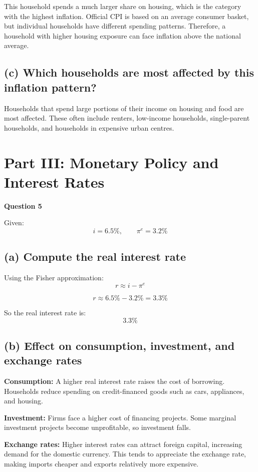 \documentclass[12pt]{article}
\begin{document}
This household spends a much larger share on housing, which is the category with the highest inflation. Official CPI is based on an average consumer basket, but individual households have different spending patterns. Therefore, a household with higher housing exposure can face inflation above the national average.

\subsection*{(c) Which households are most affected by this inflation pattern?}

Households that spend large portions of their income on housing and food are most affected. These often include renters, low-income households, single-parent households, and households in expensive urban centres.

\section*{Part III: Monetary Policy and Interest Rates}

\textbf{Question 5}

Given:
\[
i = 6.5\%, \qquad \pi^e = 3.2\%
\]

\subsection*{(a) Compute the real interest rate}

Using the Fisher approximation:
\[
r \approx i - \pi^e
\]

\[
r \approx 6.5\% - 3.2\% = 3.3\%
\]

So the real interest rate is:
\[
\boxed{3.3\%}
\]

\subsection*{(b) Effect on consumption, investment, and exchange rates}

\textbf{Consumption:}  
A higher real interest rate raises the cost of borrowing. Households reduce spending on credit-financed goods such as cars, appliances, and housing.

\textbf{Investment:}  
Firms face a higher cost of financing projects. Some marginal investment projects become unprofitable, so investment falls.

\textbf{Exchange rates:}  
Higher interest rates can attract foreign capital, increasing demand for the domestic currency. This tends to appreciate the exchange rate, making imports cheaper and exports relatively more expensive.
\end{document}
